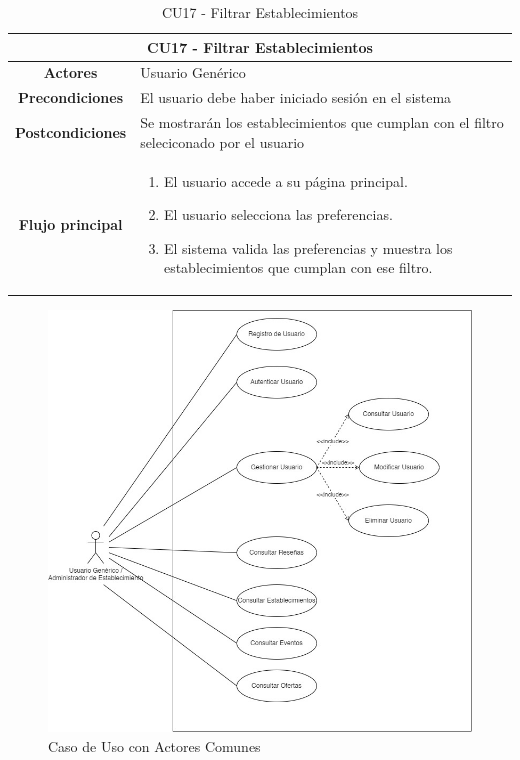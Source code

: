 \begin{table}[h]
    \centering
    \begin{tabular}{|c|p{10cm}|}
        \hline
        \multicolumn{2}{|c|}{\textbf{CU17 - Filtrar Establecimientos}}                                                                \\
        \hline
        \textbf{Actores}         & Usuario Genérico                                                                                   \\
        \hline
        \textbf{Precondiciones}  & El usuario debe haber iniciado sesión en el sistema                                                \\
        \hline
        \textbf{Postcondiciones} & Se mostrarán los establecimientos que cumplan con el filtro seleciconado por el usuario            \\
        \hline
        \textbf{Flujo principal} & \begin{enumerate}
                                       \item El usuario accede a su página principal.
                                       \item El usuario selecciona las preferencias.
                                       \item El sistema valida las preferencias y muestra los establecimientos que cumplan con ese filtro.
                                   \end{enumerate} \\
        \hline
    \end{tabular}
    \caption{CU17 - Filtrar Establecimientos }
\end{table}

\clearpage
\begin{figure}[H]
    \centering
    \includegraphics[width=\textwidth]{imagenes/CasoDeUsoComun.jpg}
    \caption{Caso de Uso con Actores Comunes}
    \label{fig:CasoDeUsoComun}
\end{figure}

